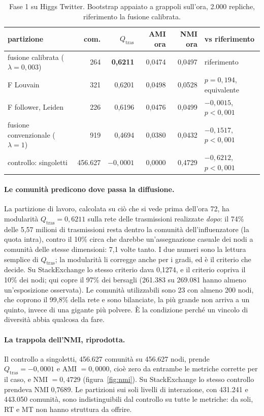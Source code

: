 \documentclass[11pt,a4paper]{article}
\newcommand{\Qtras}{Q_{\mathrm{tras}}}
\newcommand{\sx}{StackExchange}
\newcommand{\hg}{Higgs Twitter}
\begin{document}
\begin{table}[htbp]
  \centering\small
  \caption{Fase 1 su \hg{}. Bootstrap appaiato a grappoli sull'ora, 2.000 repliche, riferimento la fusione calibrata.}
  \label{tab:fase1}
  \begin{tabular}{lrrrrl}
    \toprule
    partizione & com. & $\Qtras$ & AMI ora & NMI ora & vs riferimento \\
    \midrule
    fusione calibrata ($\lambda=0{,}003$) & 264 & \textbf{0,6211} & 0,0474 & 0,0497 & riferimento \\
    F Louvain & 321 & 0,6201 & 0,0498 & 0,0528 & $p=0{,}194$, equivalente \\
    F follower, Leiden & 226 & 0,6196 & 0,0476 & 0,0499 & $-0{,}0015$, $p<0{,}001$ \\
    fusione convenzionale ($\lambda=1$) & 919 & 0,4694 & 0,0380 & 0,0432 & $-0{,}1517$, $p<0{,}001$ \\
    controllo: singoletti & 456.627 & $-0{,}0001$ & 0,0000 & 0,4729 & $-0{,}6212$, $p<0{,}001$ \\
    \bottomrule
  \end{tabular}
\end{table}
\paragraph{Le comunità predicono dove passa la diffusione.} La partizione di lavoro, calcolata su ciò che si vede prima dell'ora 72, ha modularità $\Qtras = 0{,}6211$ sulla rete delle trasmissioni realizzate \emph{dopo}: il 74\% delle 5,57 milioni di trasmissioni resta dentro la comunità dell'influenzatore (la quota intra), contro il 10\% circa che darebbe un'assegnazione casuale dei nodi a comunità delle stesse dimensioni: 7,1 volte tanto. I due numeri sono la lettura semplice di $\Qtras$; la modularità li corregge anche per i gradi, ed è il criterio che decide. Su \sx{} lo stesso criterio dava 0,1274, e il criterio copriva il 10\% dei nodi; qui copre il 97\% dei bersagli (261.383 su 269.081 hanno almeno un'esposizione osservata). Le comunità utilizzabili sono 23 con almeno 200 nodi, che coprono il 99,8\% della rete e sono bilanciate, la più grande non arriva a un quinto, invece di una gigante più polvere. È la condizione perché un vincolo di diversità abbia qualcosa da fare.

\paragraph{La trappola dell'NMI, riprodotta.} Il controllo a singoletti, 456.627 comunità su 456.627 nodi, prende $\Qtras = -0{,}0001$ e AMI $= 0{,}0000$, cioè zero da entrambe le metriche corrette per il caso, e NMI $= 0{,}4729$ (figura~\ref{fig:nmi}). Su \sx{} lo stesso controllo prendeva NMI 0,7689. Le partizioni sui soli livelli di interazione, con 431.241 e 443.050 comunità, sono indistinguibili dal controllo su tutte le metriche: da soli, RT e MT non hanno struttura da offrire.
\end{document}
